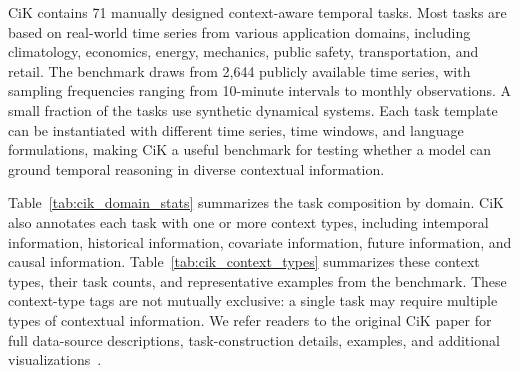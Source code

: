 CiK contains 71 manually designed context-aware temporal tasks. Most tasks are based on real-world time series from various application domains, including climatology, economics, energy, mechanics, public safety, transportation, and retail. The benchmark draws from 2,644 publicly available time series, with sampling frequencies ranging from 10-minute intervals to monthly observations. A small fraction of the tasks use synthetic dynamical systems. Each task template can be instantiated with different time series, time windows, and language formulations, making CiK a useful benchmark for testing whether a model can ground temporal reasoning in diverse contextual information.

Table~\ref{tab:cik_domain_stats} summarizes the task composition by domain.
CiK also annotates each task with one or more context types, including
intemporal information, historical information, covariate information, future
information, and causal information. Table~\ref{tab:cik_context_types}
summarizes these context types, their task counts, and representative examples
from the benchmark. These context-type tags are not mutually exclusive: a
single task may require multiple types of contextual information. We refer
readers to the original CiK paper for full data-source descriptions,
task-construction details, examples, and additional visualizations~\citep{DBLP:conf/icml/WilliamsAMZSRRL25}.



\begin{table}[t]
\centering
\caption{Task composition of the TSAIA Finance benchmark used in our
experiments. The tasks cover portfolio risk, risk-adjusted return, and
market-relative stock behavior.}
\small
{}
\label{tab:tsaia_finance_stats}
\end{table}








